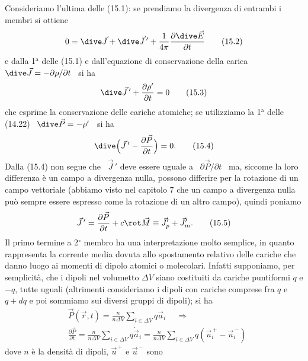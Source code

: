 Consideriamo l'ultima delle (15.1): se prendiamo la divergenza di entrambi i
membri si ottiene
\begin{equation}
  0=\dive\vec J+\dive\vec J\,'
  +\frac{1}{4\pi}\frac{\partial\dive\vec E}{\partial t}
  \tag{15.2}
\end{equation}
e dalla 1$^\mathrm{a}$ delle (15.1) e dall'equazione di conservazione della
carica \ $\dive\vec J=-\partial\rho/\partial t$ \ si ha
\begin{equation}
  \dive\vec J\,'+\frac{\partial\rho'}{\partial t}=0
  \tag{15.3}
\end{equation}
che esprime la conservazione delle cariche atomiche; se utilizziamo la
1$^\mathrm{a}$ delle (14.22) \ $\dive\vec P=-\rho'$ \ si ha
\begin{equation}
  \dive\Big(\vec J\,'-\frac{\partial\vec P}{\partial t}\Big)=0.
  \tag{15.4}
\end{equation}
Dalla (15.4) non segue che \ $\vec J\,'$ deve essere uguale a
\ $\partial\vec P/\partial t$ \ ma, siccome la loro differenza \`e un campo a
divergenza nulla, possono differire per la rotazione di un campo vettoriale
(abbiamo visto nel capitolo 7 che un campo a divergenza nulla pu\`o sempre
essere espresso come la rotazione di un altro campo), quindi poniamo
\begin{equation}
  \vec J\,'=\frac{\partial\vec P}{\partial t}+c\rot\vec M
  \equiv\vec J_p'+\vec J_m'.
  \tag{15.5}
\end{equation}
Il primo termine a 2$^\circ$ membro ha una interpretazione molto semplice, in
quanto rappresenta la corrente media dovuta allo spostamento relativo delle
cariche che danno luogo ai momenti di dipolo atomici o molecolari. Infatti
supponiamo, per semplicit\`a, che i dipoli nel volumetto $\Delta V$ siano
costituiti da cariche puntiformi $q$ e $-q$, tutte uguali (altrimenti
consideriamo i dipoli con cariche comprese fra $q$ e $q+dq$ e poi sommiamo sui
diversi gruppi di dipoli); si ha
\begin{equation}
  \begin{aligned}
    &\vec P(\vec r,t)=\frac{n}{n\Delta V}\sum_{i\in\Delta V}q\vec a_i
    \quad\ \Rightarrow\\
    &\frac{\partial\vec P}{\partial t}=\frac{n}{n\Delta V}
    \sum_{i\in\Delta V}q\dot{\vec a}_i
    =\frac{n}{n\Delta V}\sum_{i\in\Delta V}q(\vec u_i^{\,+}-\vec u_i^{\,-})
  \end{aligned}
  \tag{15.6}
\end{equation}
dove $n$ \`e la densit\`a di dipoli, $\vec u^{\,+}$ e $\vec u^{\,-}$ sono
